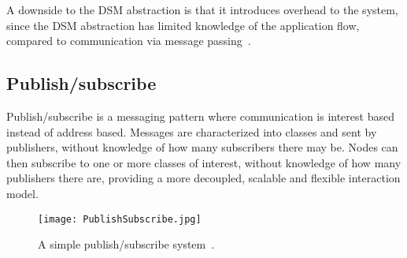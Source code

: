 A downside to the DSM abstraction is that it introduces overhead to the system, since the DSM abstraction has limited knowledge of the application flow, compared to communication via message passing~\cite{lu1995message}. 

 









\subsection{Publish/subscribe}

Publish/subscribe is a messaging pattern where communication is interest based instead of address based. Messages are characterized into classes and sent by publishers, without knowledge of how many subscribers there may be. Nodes can then subscribe to one or more classes of interest, without knowledge of how many publishers there are, providing a more decoupled, scalable and flexible interaction model.

\begin{figure}
	\centering
	\texttt{[image: PublishSubscribe.jpg]} 
	\caption[Distributed Computing System with 2 nodes]{
		\label{fig:publishSubscribe} 
		\footnotesize{%
			A simple publish/subscribe system~\cite{eugster2003many}.
		}
	}
\end{figure}

